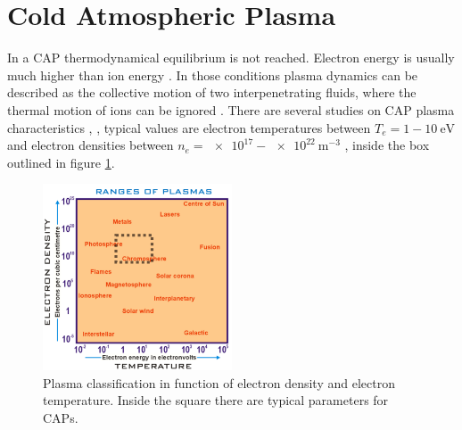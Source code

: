 \section{Cold Atmospheric Plasma}
In a CAP thermodynamical equilibrium is not reached. Electron energy is usually much higher than ion energy \cite{VONENGEL196599}. In those conditions plasma dynamics can be described as the collective motion of two interpenetrating fluids, where the thermal motion of ions can be ignored \cite{goossens2012introduction}.
There are several studies on CAP plasma characteristics \cite{Zhu_2009}, \cite{Ohyama_2009}, \cite{Amorim_2015} typical values are electron temperatures between $T_e = 1 - \SI{10}{\electronvolt}$ and electron densities between $n_e = \num{e17} - \SI{e22}{\meter^{-3}}$ , inside the box outlined in figure \ref{fig:plasmaclass}. 
\begin{figure}
 \centering
 \includegraphics[width=0.5\textwidth]{Images/Intro/Plasma_classification2.png}
 \caption{Plasma classification in function of electron density and electron temperature. Inside the square there are typical parameters for CAPs.}
 \label{fig:plasmaclass}
\end{figure}


